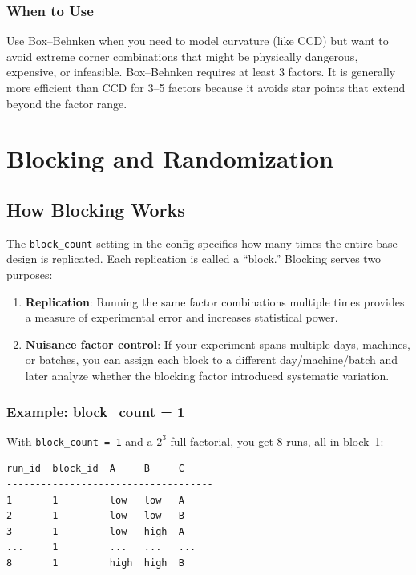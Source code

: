 \documentclass[11pt]{book}
\begin{document}
\subsection{When to Use}

Use Box--Behnken when you need to model curvature (like CCD) but want to avoid extreme corner combinations that might be physically dangerous, expensive, or infeasible. Box--Behnken requires at least 3 factors. It is generally more efficient than CCD for 3--5 factors because it avoids star points that extend beyond the factor range.


\chapter{Blocking and Randomization}
\label{ch:blocking}

\section{How Blocking Works}

The \texttt{block\_count} setting in the config specifies how many times the entire base design is replicated. Each replication is called a ``block.'' Blocking serves two purposes:

\begin{enumerate}
  \item \textbf{Replication}: Running the same factor combinations multiple times provides a measure of experimental error and increases statistical power.
  \item \textbf{Nuisance factor control}: If your experiment spans multiple days, machines, or batches, you can assign each block to a different day/machine/batch and later analyze whether the blocking factor introduced systematic variation.
\end{enumerate}

\subsection{Example: block\_count = 1}

With \texttt{block\_count = 1} and a $2^3$ full factorial, you get 8 runs, all in block~1:

\begin{lstlisting}[language=bash]
run_id  block_id  A     B     C
------------------------------------
1       1         low   low   A
2       1         low   low   B
3       1         low   high  A
...     1         ...   ...   ...
8       1         high  high  B
\end{lstlisting}
\end{document}
